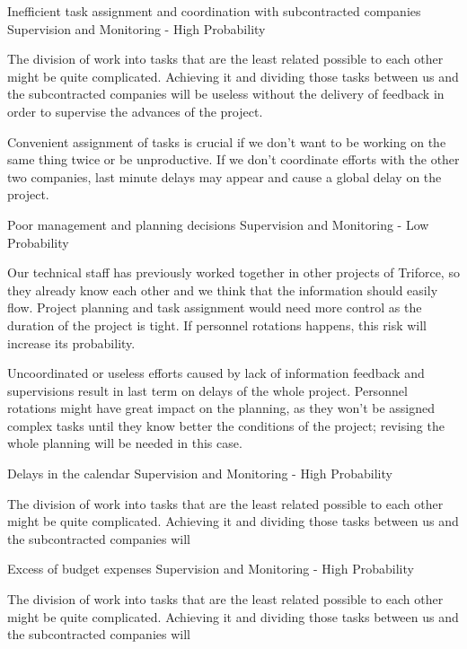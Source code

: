 \begin{risk}{Inefficient task assignment and coordination with subcontracted companies}
\riskcat Supervision and Monitoring
 - High Probability 

The division of work into tasks that are the least related possible to each other might be quite complicated. Achieving it and dividing those tasks between us and the subcontracted companies will be useless without the delivery of feedback in order to supervise the advances of the project.

Convenient assignment of tasks is crucial if we don't want to be working on the same thing twice or be unproductive. If we don't coordinate efforts with the other two companies, last minute delays may appear and cause a global delay on the project.
\end{risk}

\begin{risk}{Poor management and planning decisions}
\riskcat Supervision and Monitoring
 - Low Probability 

Our technical staff has previously worked together in other projects of Triforce, so they already know each other and we think that the information should easily flow. Project planning and task assignment would need more control as the duration of the project is tight. If personnel rotations happens, this risk will increase its probability.

Uncoordinated or useless efforts caused by lack of information feedback and supervisions result in last term on delays of the whole project. Personnel rotations might have great impact on the planning, as they won't be assigned complex tasks until they know better the conditions of the project; revising the whole planning will be needed in this case.
\end{risk}

\begin{risk}{Delays in the calendar}
\riskcat Supervision and Monitoring
 - High Probability 

The division of work into tasks that are the least related possible to each other might be quite complicated. Achieving it and dividing those tasks between us and the subcontracted companies will \end{risk}

\begin{risk}{Excess of budget expenses}
\riskcat Supervision and Monitoring
 - High Probability 

The division of work into tasks that are the least related possible to each other might be quite complicated. Achieving it and dividing those tasks between us and the subcontracted companies will 
\end{risk}

